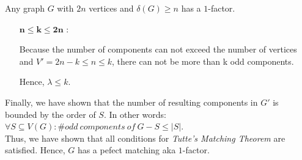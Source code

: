 \documentclass[a4paper]{article}
\begin{document}
\begin{solution}{12}
\begin{theorem}{Any graph $G$ with $2n$ vertices and $\delta(G) \geq n$ has a $1$-factor.}
\begin{itemize}
\begin{itemize}
							As the minimum size of a component in $G'$ is $n-k+1$ and $|V'|=2n-k$, we can bound the amount of components by the following term: $\frac{2n-k}{n-k+1}$.

							We now have to prove that 
							$\frac{2n-k}{n-k+1} \leq k \iff 2n-k \leq k*n-k^2+k \iff 0 \leq (k-2)n-k^2+2k =: f(k)$.

							To prove this inequality, we have to determine the minimum value of $f$ in the defined boundaries.
							\begin{itemize}
								\item $f'(k)=n-2k+2 =^! 0 \iff k=\frac{n}{2}+1$
								\item $f''(k)=-2$
							\end{itemize}
							So $f$ has a maximum but no local minimum. To find the minimum value within the given range, we have to check the borders:

							$f(2)=0=f(n)$. Thus, $\min(f)=0 \geq f(k)$ which proves the inequality.

							All in all, we have shown that the number of compomonents deceeds or is equal to $k$. This implies that $\lambda \leq k$.
					\item[$\mathbf{n \leq k \leq 2n}$]:

						Because the number of components can not exceed the number of vertices and $V'=2n-k\leq n \leq k$, there can not  be more than k odd components.

						Hence, $\lambda \leq k$.
				\end{itemize}
				Finally, we have shown that the number of resulting components in $G'$ is bounded by the order of $S$.
				In other words: $\forall  S \subseteq V(G): \#odd\ components\ of\ G-S \leq |S|$.\\

				Thus, we have shown that all conditions for \emph{Tutte's Matching Theorem} are satisfied. Hence, $G$ has a pefect matching aka $1$-factor.
			\end{itemize}
		\end{theorem}
	\end{solution}
	
\end{document}
